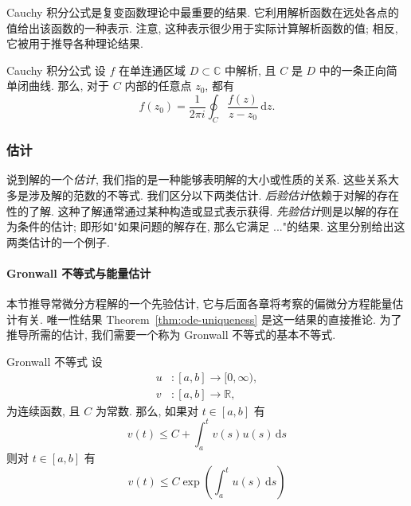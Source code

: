 Cauchy 积分公式是复变函数理论中最重要的结果. 它利用解析函数在远处各点的值给出该函数的一种表示. 注意, 这种表示很少用于实际计算解析函数的值; 相反, 它被用于推导各种理论结果.

\begin{Theorem}{Cauchy 积分公式}
\label{thm:cauchy-integral-formula}
设 $f$ 在单连通区域 $D\subset\mathbb{C}$ 中解析, 且 $C$ 是 $D$ 中的一条正向简单闭曲线. 那么, 对于 $C$ 内部的任意点 $z_0$, 都有
\begin{equation}\label{eq:cauchy-integral-formula}
f(z_0)=\dfrac{1}{2\pi i}\oint_C\dfrac{f(z)}{z-z_0}\,\mathrm{d}z.
\end{equation}

\end{Theorem}

\subsubsection{估计}\label{subsec:estimation}

说到解的一个\emph{估计}, 我们指的是一种能够表明解的大小或性质的关系. 这些关系大多是涉及解的范数的不等式. 我们区分以下两类估计. \emph{后验估计}依赖于对解的存在性的了解. 这种了解通常通过某种构造或显式表示获得. \emph{先验估计}则是以解的存在为条件的估计; 即形如"如果问题的解存在, 那么它满足 ..."的结果. 这里分别给出这两类估计的一个例子.

\paragraph*{Gronwall 不等式与能量估计}

本节推导常微分方程解的一个先验估计, 它与后面各章将考察的偏微分方程能量估计有关. 唯一性结果 Theorem~\ref{thm:ode-uniqueness} 是这一结果的直接推论. 为了推导所需的估计, 我们需要一个称为 Gronwall 不等式的基本不等式.

\begin{Lemma}{Gronwall 不等式}
\label{lem:gronwall}
设
\[
\begin{aligned}u&:[a,b]\to[0,\infty),\\v&:[a,b]\to\mathbb{R},\end{aligned}
\]
为连续函数, 且 $C$ 为常数. 那么, 如果对 $t\in[a,b]$ 有
\begin{equation}\label{eq:gronwall-integral-hypothesis}
v(t)\leq C+\int_a^tv(s)u(s)\,\mathrm{d}s
\end{equation}
则对 $t\in[a,b]$ 有
\begin{equation}\label{eq:gronwall-exponential-bound}
v(t)\leq C\exp\left(\int_a^tu(s)\,\mathrm{d}s\right)
\end{equation}

\end{Lemma}

